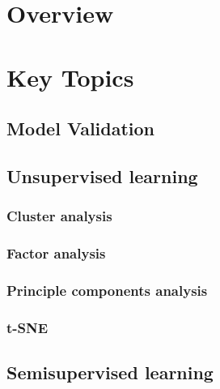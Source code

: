 \documentclass[
]{book}
\begin{document}
\hypertarget{overview}{%
\section{Overview}\label{overview}}

\hypertarget{key-topics}{%
\section{Key Topics}\label{key-topics}}

\hypertarget{model-validation}{%
\subsection{Model Validation}\label{model-validation}}

\hypertarget{unsupervised-learning}{%
\subsection{Unsupervised learning}\label{unsupervised-learning}}

\hypertarget{cluster-analysis}{%
\subsubsection{Cluster analysis}\label{cluster-analysis}}

\hypertarget{factor-analysis}{%
\subsubsection{Factor analysis}\label{factor-analysis}}

\hypertarget{principle-components-analysis}{%
\subsubsection{Principle components analysis}\label{principle-components-analysis}}

\hypertarget{t-sne}{%
\subsubsection{t-SNE}\label{t-sne}}

\hypertarget{semisupervised-learning}{%
\subsection{Semisupervised learning}\label{semisupervised-learning}}
\end{document}
